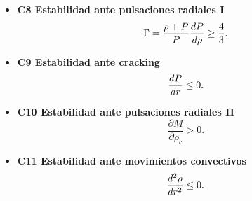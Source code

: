 \documentclass[11pt]{beamer}
\begin{document}
\begin{frame}{}
    \begin{itemize}
        \item \textbf{C8 Estabilidad ante pulsaciones radiales I} \\
            \begin{equation}
                \Gamma = \frac { \rho + P  } { P } \dv{P}{\rho} \geq \frac{4}{3}.
            \end{equation}
        \item \textbf{C9 Estabilidad ante cracking} \\
            \begin{equation}
                \dv{P}{r}\leq 0.
            \end{equation}
        \item \textbf{C10 Estabilidad ante pulsaciones radiales II} \\
            \begin{equation}
                \frac { \partial M } { \partial \rho _ { c } } > 0.
            \end{equation}
        \item \textbf{C11 Estabilidad ante movimientos convectivos} \\
            \begin{equation}
                \dv[2]{\rho }{r} \leq 0.
            \end{equation}
    \end{itemize}
\end{frame}
\end{document}
